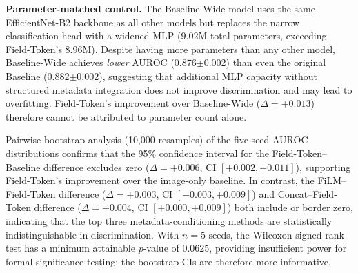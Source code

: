 \documentclass[12pt, a4paper]{article}
\begin{document}
\begin{table}[htbp]
\centering
\caption{Multi-seed evaluation on ISIC 2019 test set ($n = 5$ seeds: 42, 123, 456, 789, 2024). Results are reported as mean $\pm$ standard deviation. Threshold-dependent metrics use the Youden-optimal threshold from each seed's validation set. Baseline-Wide is a parameter-matched image-only control (9.02M parameters, widened MLP classifier).}
\label{tab:multi_seed}
\end{table}

\textbf{Parameter-matched control.} The Baseline-Wide model uses the same EfficientNet-B2 backbone as all other models but replaces the narrow classification head with a widened MLP (9.02M total parameters, exceeding Field-Token's 8.96M). Despite having more parameters than any other model, Baseline-Wide achieves \emph{lower} AUROC (0.876$\pm$0.002) than even the original Baseline (0.882$\pm$0.002), suggesting that additional MLP capacity without structured metadata integration does not improve discrimination and may lead to overfitting. Field-Token's improvement over Baseline-Wide ($\Delta = +0.013$) therefore cannot be attributed to parameter count alone.

Pairwise bootstrap analysis (10{,}000 resamples) of the five-seed AUROC distributions confirms that the 95\% confidence interval for the Field-Token--Baseline difference excludes zero ($\Delta = +0.006$, CI $[+0.002, +0.011]$), supporting Field-Token's improvement over the image-only baseline. In contrast, the FiLM--Field-Token difference ($\Delta = +0.003$, CI $[-0.003, +0.009]$) and Concat--Field-Token difference ($\Delta = +0.004$, CI $[+0.000, +0.009]$) both include or border zero, indicating that the top three metadata-conditioning methods are statistically indistinguishable in discrimination. With $n = 5$ seeds, the Wilcoxon signed-rank test has a minimum attainable $p$-value of 0.0625, providing insufficient power for formal significance testing; the bootstrap CIs are therefore more informative.
\end{document}
